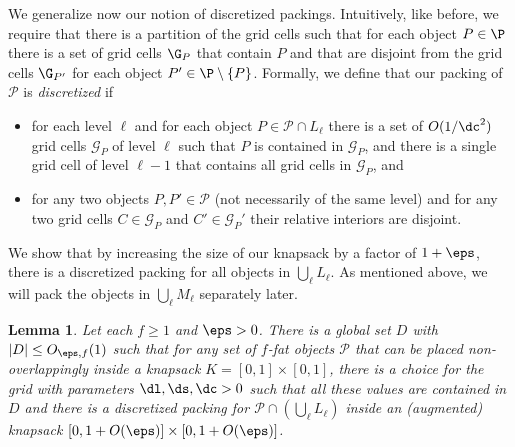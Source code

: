 \documentclass[10pt,a4paper]{article}
\newtheorem{lemma}{Lemma}[section]
\theoremstyle{plain}
\theoremstyle{plain}
\theoremstyle{plain}
\theoremstyle{definition}
\newcommand{\ari}[1]{#1}
\begin{document}
We generalize now our notion of discretized packings. Intuitively,
like before, we require that there is a partition of the grid cells
such that for each object $P\in\P$ there is a set of grid cells $\G_{P}$
that contain $P$ and that are disjoint from the grid cells $\G_{P'}$
for each object $P'\in\P\setminus\{P\}$. Formally, we define that
our packing of $\mathcal{P}$ is \emph{discretized} if
\begin{itemize}
\item for each level $\ell$ and for each object $P\in\mathcal{P}\cap L_{\ell}$
there is a set of $O(1/\dc^{2})$ grid cells
$\mathcal{G}_{P}$
of level $\ell$ such that $P$ is contained in $\mathcal{G}_{P}$,
and there is a single grid cell of level $\ell-1$ that contains all
grid cells in $\mathcal{G}_{P}$, and
\item for any two objects $P,P'\in\mathcal{P}$ (not necessarily of the
same level) and for any two grid cells $C\in\mathcal{G}_{P}$ and
$C'\in\mathcal{G}_{P}'$ their relative interiors are disjoint.
\end{itemize}
We show that by increasing the size of our knapsack by a factor of
$1+\eps$, there is a discretized packing for all objects in {$\bigcup_{\ell}L_{\ell}$}.
As mentioned above, we will pack the objects in {$\bigcup_{\ell}M_{\ell}$}
separately later. %


\begin{lemma}%
	\label{lem:fatdiscrete} Let each $f\ge1$ and $\eps>0$.
There is a global set $D$ with $|D| \le O_{\eps,f}(1)$ such that for
any set of $f$-fat objects $\mathcal{P}$ that can be placed non-overlappingly
inside a knapsack $K=[0,1]\times[0,1]$, there is a choice for the
grid with parameters $\dl,\ds,\dc>0$ such that all these values are
contained in $D$ and there is a discretized packing for $\mathcal{P}\cap (\bigcup_{\ell}L_{\ell})$
inside an (augmented) knapsack \ari{$[0,1+O(\eps)]\times[0,1+O(\eps)]$}. \end{lemma}
\end{document}
